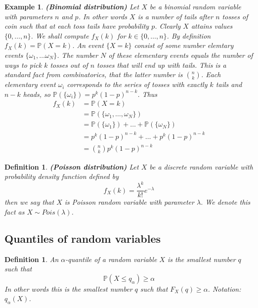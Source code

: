 \documentclass[12pt]{article}
\newtheorem{definition}[theorem]{Definition}
\newtheorem{example}[theorem]{Example}
\begin{document}
\begin{example} \textbf{(Binomial distribution)} Let $X$ be a binomial random
    variable with parameters $n$ and $p$. In other words $X$ is a number of
    tails after $n$ tosses of coin such that at each toss tails have probability
    $p$. Clearly $X$ attains values $\{0,\ldots,n\}$. We shall compute $f_X(k)$
    for $k\in \{0,\ldots,n\}$. By definition $f_X(k)=\mathbb{P}(X=k)$. An event
    $\{X=k\}$ consist of some number elemtary events
    $\{\omega_1,\ldots\omega_N\}$. The number $N$ of these elementary events
    equals the number of ways to pick $k$ tosses out of $n$ tosses that will end
    up with tails. This is a standard fact from combinatorics, that the latter
    number is $\binom{n}{k}$. Each elementary event $\omega_i$ corresponds to
    the series of tosses with exactly $k$ tails and $n-k$ heads, so
    $\mathbb{P}(\{\omega_i\})=p^k{(1-p)}^{n-k}$. Thus
    \begin{align*}
        f_X(k)
         & =\mathbb{P}(X=k)                          \\
         & =\mathbb{P}(\{\omega_1,\ldots,\omega_N\}) \\
         & =\mathbb{P}(\{\omega_1\})+
        \ldots+\mathbb{P}(\{\omega_N\})              \\ %
         & =p^k{(1-p)}^{n-k}+
        \ldots+p^k{(1-p)}^{n-k}                      \\
         & =\binom{n}{k}p^k{(1-p)}^{n-k}
    \end{align*}
\end{example}

\begin{definition} \textbf{(Poisson distribution)} Let $X$ be a discrete random
    variable with probability density function defined by
    $$
        f_X(k)=\frac{\lambda^k}{k!}e^{-\lambda}
    $$
    then we say that $X$ is Poisson random variable with parameter $\lambda$. We
    denote this fact as $X\sim Pois(\lambda)$.
\end{definition}


\subsection{Quantiles of random variables}

\begin{definition} An $\alpha$-quantile of a random variable $X$ is the smallest
    number $q$ such that
    $$
        \mathbb{P}(X\leq q_\alpha)\geq\alpha
    $$
    In other words this is the smallest number $q$ such that $F_X(q)\geq
        \alpha$. Notation: $q_\alpha(X)$.
\end{definition}
\end{document}
